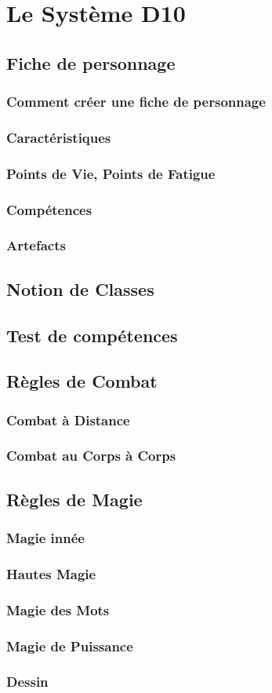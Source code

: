 \chapter{Le Système D10}
\section{Fiche de personnage}
\subsection{Comment créer une fiche de personnage}
\subsection{Caractéristiques}
\subsection{Points de Vie, Points de Fatigue}
\subsection{Compétences}
\subsection{Artefacts}
\section{Notion de Classes}
\section{Test de compétences}
\section{Règles de Combat}
\subsection{Combat à Distance}
\subsection{Combat au Corps à Corps}
\section{Règles de Magie}
\subsection{Magie innée}
\subsection{Hautes Magie}
\subsection{Magie des Mots}
\subsection{Magie de Puissance}
\subsection{Dessin}